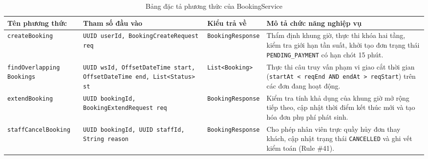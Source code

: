 \begin{table}[H]
\centering
\caption{Bảng đặc tả phương thức của BookingService}
\label{tab:spec-booking-service}
\renewcommand{\arraystretch}{1.3}
\begin{tabular}{|p{3.5cm}|p{3.5cm}|p{2.5cm}|p{5.5cm}|}
\hline
\textbf{Tên phương thức} & \textbf{Tham số đầu vào} & \textbf{Kiểu trả về} & \textbf{Mô tả chức năng nghiệp vụ} \\
\hline
\texttt{createBooking} & \texttt{UUID userId, BookingCreateRequest req} & \texttt{BookingResponse} & Thẩm định khung giờ, thực thi khóa hai tầng, kiểm tra giới hạn tần suất, khởi tạo đơn trạng thái \texttt{PENDING\_PAYMENT} có hạn chót 15 phút. \\
\hline
\texttt{findOverlapping Bookings} & \texttt{UUID wsId, OffsetDateTime start, OffsetDateTime end, List<Status> st} & \texttt{List<Booking>} & Thực thi câu truy vấn phạm vi giao cắt thời gian (\texttt{startAt < reqEnd AND endAt > reqStart}) trên các đơn đang hoạt động. \\
\hline
\texttt{extendBooking} & \texttt{UUID bookingId, BookingExtendRequest req} & \texttt{BookingResponse} & Kiểm tra tính khả dụng của khung giờ mở rộng tiếp theo, cập nhật thời điểm kết thúc mới và tạo hóa đơn phụ phí phát sinh. \\
\hline
\texttt{staffCancelBooking} & \texttt{UUID bookingId, UUID staffId, String reason} & \texttt{BookingResponse} & Cho phép nhân viên trực quầy hủy đơn thay khách, cập nhật trạng thái \texttt{CANCELLED} và ghi vết kiểm toán (Rule \#41). \\
\hline
\end{tabular}
\end{table}


